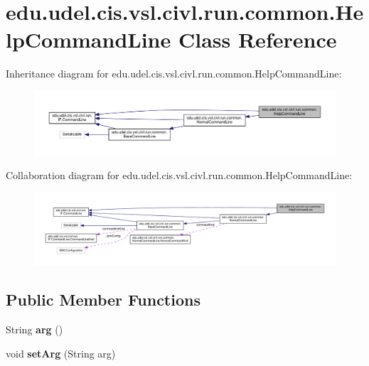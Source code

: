 \hypertarget{classedu_1_1udel_1_1cis_1_1vsl_1_1civl_1_1run_1_1common_1_1HelpCommandLine}{}\section{edu.\+udel.\+cis.\+vsl.\+civl.\+run.\+common.\+Help\+Command\+Line Class Reference}
\label{classedu_1_1udel_1_1cis_1_1vsl_1_1civl_1_1run_1_1common_1_1HelpCommandLine}


Inheritance diagram for edu.\+udel.\+cis.\+vsl.\+civl.\+run.\+common.\+Help\+Command\+Line\+:
\nopagebreak
\begin{figure}[H]
\begin{center}
\leavevmode
\includegraphics[width=350pt]{classedu_1_1udel_1_1cis_1_1vsl_1_1civl_1_1run_1_1common_1_1HelpCommandLine__inherit__graph}
\end{center}
\end{figure}


Collaboration diagram for edu.\+udel.\+cis.\+vsl.\+civl.\+run.\+common.\+Help\+Command\+Line\+:
\nopagebreak
\begin{figure}[H]
\begin{center}
\leavevmode
\includegraphics[width=350pt]{classedu_1_1udel_1_1cis_1_1vsl_1_1civl_1_1run_1_1common_1_1HelpCommandLine__coll__graph}
\end{center}
\end{figure}
\subsection*{Public Member Functions}
\begin{DoxyCompactItemize}
\item 
\hypertarget{classedu_1_1udel_1_1cis_1_1vsl_1_1civl_1_1run_1_1common_1_1HelpCommandLine_a827b6758062b140c20c6775a1dfe48ab}{}String {\bfseries arg} ()\label{classedu_1_1udel_1_1cis_1_1vsl_1_1civl_1_1run_1_1common_1_1HelpCommandLine_a827b6758062b140c20c6775a1dfe48ab}

\item 
\hypertarget{classedu_1_1udel_1_1cis_1_1vsl_1_1civl_1_1run_1_1common_1_1HelpCommandLine_a2e8b3d02497ad3f9b953dcad6341266e}{}void {\bfseries set\+Arg} (String arg)\label{classedu_1_1udel_1_1cis_1_1vsl_1_1civl_1_1run_1_1common_1_1HelpCommandLine_a2e8b3d02497ad3f9b953dcad6341266e}

\end{DoxyCompactItemize}
